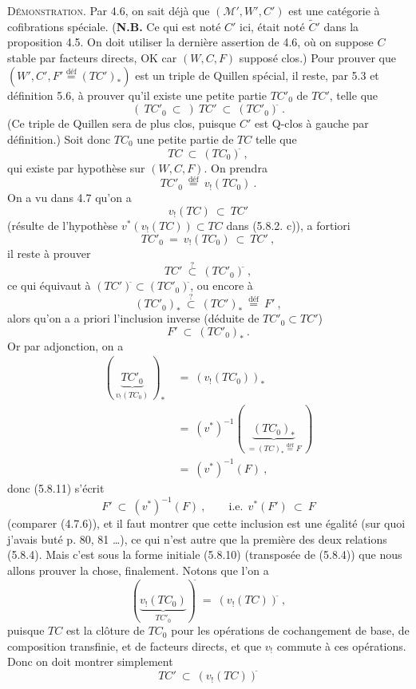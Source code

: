 \documentclass[11pt]{article}
\newcommand{\printedpage}[1]{\marginpar{\footnotesize p.~#1}}
\newcommand{\msp}[1]{\marginpar{\footnotesize [#1]}}
\newcommand{\cl}{^{\tilde{}}}%
\newcommand{\defeq}{\overset{\text{déf}}{=}}
\begin{document}
\msp{page 92}
\textsc{Démonstration}. Par 4.6, on sait déjà que $(\mathcal{M}', W', C')$ est une catégorie à cofibrations spéciale. (\textbf{N.B.} Ce qui est noté $C'$ ici, était noté $\tilde{C}'$ dans la proposition 4.5. On doit utiliser la dernière assertion de 4.6, où on suppose $C$ stable par facteurs directs, OK car $(W, C, F)$ supposé clos.) Pour prouver que $(W', C', F' \defeq (TC')_*)$ est un triple de Quillen
\printedpage{46}
spécial, il reste, par 5.3 et définition 5.6, à prouver qu'il existe une petite partie $TC'_0$ de $TC'$, telle que
\[
(\ TC'_0 \ \subset\ )\ TC' \ \subset \ (TC'_0)\cl\ .
\tag*{(5.8.6)}
\]
(Ce triple de Quillen sera de plus clos, puisque $C'$ est Q-clos à gauche par définition.) Soit donc $TC_0$ une petite partie de $TC$ telle que
\[
TC \ \subset \ (TC_0)\cl\ ,
\tag*{(5.8.7)}
\]
qui existe par hypothèse sur $(W, C, F)$. On prendra
\[
TC'_0 \ \defeq \ v_!(TC_0)\ .
\tag*{(5.8.8)}
\]
On a vu dans 4.7 qu'on a
\[
v_!(TC) \ \subset \ TC'
\tag*{(5.8.9)}
\]
(résulte de l'hypothèse $v^*(v_!(TC)) \subset TC$ dans (5.8.2. c)), a fortiori
\[
TC'_0 \ = \ v_!(TC_0) \ \subset \ TC'\ ,
\]
\msp{page 93}
il reste à prouver
\[
TC' \ \overset{?}{\subset} \ (TC'_0)\cl\ ,
\tag*{(5.8.10)}
\]
ce qui équivaut à $(TC')\cl \subset (TC'_0)\cl$, ou encore à
\[
(TC'_0)_* \ \overset{?}{\subset} \ (TC')_* \ \defeq \ F'\ ,
\tag*{(5.8.10 bis)}
\]
alors qu'on a a priori l'inclusion inverse (déduite de $TC'_0 \subset TC'$)
\[
F' \ \subset \ (TC'_0)_*\ .
\tag*{(5.8.11)}
\]
Or par adjonction, on a
\[
\begin{aligned}
(\ \underbrace{TC'_0}_{v_!(TC_0)}\ )_* \ &= \ (v_!(TC_0))_*\\
&= \ (v^*)^{-1}(\ \underbrace{(TC_0)_*}_{= (TC)_* \defeq F}\ )\\
&= \ (v^*)^{-1}(F)\ ,
\end{aligned}
\]
donc (5.8.11) s'écrit
\[
F' \ \subset \ (v^*)^{-1}(F)\ , \qquad \text{i.e.}\ \ v^*(F') \ \subset \ F
\tag*{(5.8.12)}
\]
(comparer (4.7.6)), et il faut montrer que cette inclusion est une égalité (sur quoi j'avais buté p. 80, 81 \ldots), ce qui n'est autre que la première des deux relations (5.8.4). Mais c'est sous la forme initiale (5.8.10) (transposée de (5.8.4)) que nous allons prouver la chose, finalement. Notons que l'on a
\printedpage{47}
\msp{page 94}
\[
(\underbrace{v_!(TC_0)}_{TC'_0})\cl \ = \ (v_!(TC))\cl\ ,
\]
puisque $TC$ est la clôture de $TC_0$ pour les opérations de cochangement de base, de composition transfinie, et de facteurs directs, et que $v_!$ commute à ces opérations. Donc on doit montrer simplement
\[
TC' \ \subset \ (v_!(TC))\cl
\tag*{(5.8.12 bis)}
\]
\end{document}
